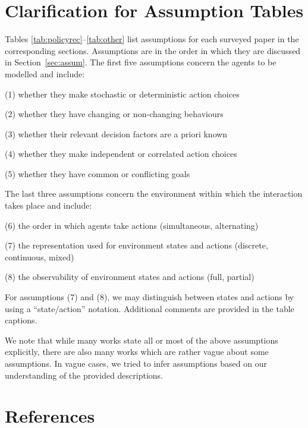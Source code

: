 \documentclass[final,1p,times,authoryear]{elsarticle}
\begin{document}
	\appendix
	\section[\hspace{5em}Clarification for Assumption Tables]{Clarification for Assumption Tables} \label{sec:appendix}

Tables \ref{tab:policyrec}--\ref{tab:other} list assumptions for each surveyed paper in the corresponding sections. Assumptions are in the order in which they are discussed in Section~\ref{sec:assum}. The first five assumptions concern the agents to be modelled and include:

\begin{description}[labelindent=10pt,itemsep=1pt]
	\item (1) whether they make stochastic or deterministic action choices
	\item (2) whether they have changing or non-changing behaviours
	\item (3) whether their relevant decision factors are a priori known
	\item (4) whether they make independent or correlated action choices
	\item (5) whether they have common or conflicting goals
\end{description}

The last three assumptions concern the environment within which the interaction takes place and include:

\begin{description}[labelindent=10pt,itemsep=1pt]
	\item (6) the order in which agents take actions (simultaneous, alternating)
	\item (7) the representation used for environment states and actions (discrete, continuous, mixed)
	\item (8) the observability of environment states and actions (full, partial)
\end{description}

For assumptions (7) and (8), we may distinguish between states and actions by using a ``state/action'' notation. Additional comments are provided in the table captions.

We note that while many works state all or most of the above assumptions explicitly, there are also many works which are rather vague about some assumptions. In vague cases, we tried to infer assumptions based on our understanding of the provided descriptions.



	\section*{References}
	 
	
\end{document}
